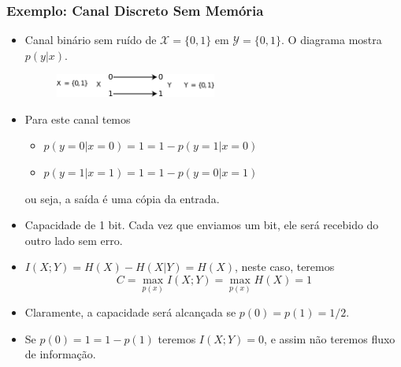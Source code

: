 \begin{frame}[allowframebreaks]
  \frametitle{Exemplo: Canal Discreto Sem Memória}
  \begin{itemize}
  \item Canal binário sem ruído de $\mathcal{X} = \{0,1\}$ em $\mathcal{Y} = \{0,1\}$. 
	O diagrama mostra $p(y|x)$.

                \begin{figure}[h!]
                \centering
                \includegraphics[width=0.5\textwidth]{images/bsc.pdf}
                \label{fig:bsc}
                \end{figure}

  \item Para este canal temos
	\begin{itemize}
	\item $p(y=0 | x = 0) = 1 = 1 - p(y=1 | x=0)$
	\item $p(y=1 | x = 1) = 1 = 1 - p(y=0 | x=1)$
	\end{itemize}
	ou seja, a saída é uma cópia da entrada.
  \item Capacidade de 1 bit. Cada vez que enviamos um bit, ele será recebido do outro lado sem erro.
  \item $I(X;Y) = H(X) - H(X|Y) = H(X)$, neste caso, teremos
	\begin{equation}
	C = \max_{p(x)} I(X;Y) = \max_{p(x)} H(X) = 1
	\end{equation}
  \item Claramente, a capacidade será alcançada se $p(0) = p(1) = 1/2$.
  \item Se $p(0)=1=1-p(1)$ teremos $I(X;Y)=0$, e assim não teremos fluxo de informação.
  \end{itemize}
\end{frame}

